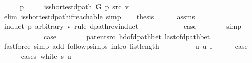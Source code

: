 \begin{isabellebody}
\ \ \isamarkupfalse%
\ \isamarkupfalse%
\ p\ \isanewline
\ \ \ \ {\isachardoublequoteopen}is{\isacharunderscore}{\kern0pt}shortest{\isacharunderscore}{\kern0pt}dpath\ G\ p\ src\ v{\isachardoublequoteclose}\isanewline
\ \ \ \ \isamarkupfalse%
\ {\isacharparenleft}{\kern0pt}elim\ is{\isacharunderscore}{\kern0pt}shortest{\isacharunderscore}{\kern0pt}dpath{\isacharunderscore}{\kern0pt}if{\isacharunderscore}{\kern0pt}reachable{\isacharunderscore}{\kern0pt}{}{\isacharparenright}{\kern0pt}\ simp{\isacharplus}{\kern0pt}\isanewline
\ \ \isamarkupfalse%
\ {\isacharquery}{\kern0pt}thesis\isanewline
\ \ \ \ \isamarkupfalse%
\ assms\isanewline
\ \ \isamarkupfalse%
\ {\isacharparenleft}{\kern0pt}induct\ p\ arbitrary{\isacharcolon}{\kern0pt}\ v\ rule{\isacharcolon}{\kern0pt}\ dpath{\isacharunderscore}{\kern0pt}rev{\isacharunderscore}{\kern0pt}induct{\isacharparenright}{\kern0pt}\isanewline
\ \ \ \ \isamarkupfalse%
\ {}\isanewline
\ \ \ \ \isamarkupfalse%
\ {\isacharquery}{\kern0pt}case\isanewline
\ \ \ \ \ \ \isamarkupfalse%
\ simp\isanewline
\ \ \isamarkupfalse%
\isanewline
\ \ \ \ \isamarkupfalse%
\ {}\isanewline
\ \ \ \ \isamarkupfalse%
\ {\isacharquery}{\kern0pt}case\isanewline
\ \ \ \ \ \ \isamarkupfalse%
\ parent{\isacharunderscore}{\kern0pt}src\ hd{\isacharunderscore}{\kern0pt}of{\isacharunderscore}{\kern0pt}dpath{\isacharunderscore}{\kern0pt}bet{\isacharprime}{\kern0pt}\ last{\isacharunderscore}{\kern0pt}of{\isacharunderscore}{\kern0pt}dpath{\isacharunderscore}{\kern0pt}bet\isanewline
\ \ \ \ \ \ \isamarkupfalse%
\ {\isacharparenleft}{\kern0pt}fastforce\ simp\ add{\isacharcolon}{\kern0pt}\ follow{\isacharunderscore}{\kern0pt}psimps\ intro{\isacharcolon}{\kern0pt}\ list{\isacharunderscore}{\kern0pt}length{\isacharunderscore}{\kern0pt}{}{\isacharparenright}{\kern0pt}\isanewline
\ \ \isamarkupfalse%
\isanewline
\ \ \ \ \isamarkupfalse%
\ {\isacharparenleft}{\kern0pt}{}\ u\ u{\isacharprime}{\kern0pt}\ l{\isacharparenright}{\kern0pt}\isanewline
\ \ \ \ \isamarkupfalse%
\ {\isacharquery}{\kern0pt}case\isanewline
\ \ \ \ \isamarkupfalse%
\ {\isacharparenleft}{\kern0pt}cases\ {\isachardoublequoteopen}white\ s\ u{\isachardoublequoteclose}{\isacharparenright}{\kern0pt}\isanewline
\ \ \ \ \ \ \isamarkupfalse%

\end{isabellebody}
